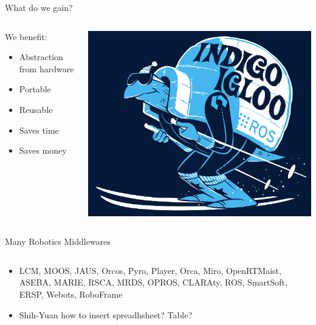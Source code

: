 \documentclass{beamer}
\begin{document}
\begin{frame}{What do we gain?}
\begin{columns}
	\begin{column}{0.55\textwidth}
We benefit:		\begin{itemize}
			\item Abstraction from hardware
                        \item Portable
                        \item Reusable
                        \item Saves time
                        \item Saves money
		\end{itemize} \end{column} \begin{column}{0.45\textwidth} \centering \includegraphics[width=\textwidth]{fig/indigoigloo_600.png} \end{column}
\end{columns}

\end{frame}
 
\begin{frame}{Many Robotics Middlewares}
	\begin{columns}
		\begin{column}{0.6\textwidth}
			\begin{itemize}
				\item LCM, MOOS, JAUS, Orcos, Pyro, Player, Orca, Miro, OpenRTMaist, ASEBA, MARIE, RSCA, MRDS, OPROS, CLARAty, ROS, SmartSoft, ERSP, Webots, RoboFrame
                                \item \alert{Shih-Yuan} how to insert spreadhsheet? Table?
			\end{itemize}
		\end{column}
		\begin{column}{0.4\textwidth}
			\centering
		\end{column}
	\end{columns}
\end{frame}
\end{document}
